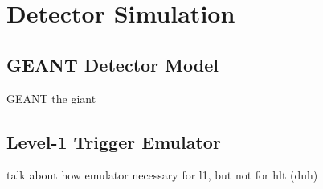 \section{Detector Simulation}
\label{sim:Detector}

\subsection{GEANT Detector Model}
\label{sim:DetectorGeant}

GEANT the giant

\subsection{Level-1 Trigger Emulator}
\label{sim:DetectorL1Emul}
talk about how emulator necessary for l1, but not for hlt (duh)
